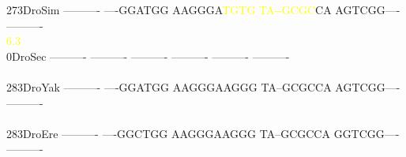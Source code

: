 \documentclass[11pt,twoside,reqno,a4paper]{article}
\begin{document}
{273\hspace*{1\charwidth}DroSim	----------	----GGATGG	AAGGGA\textcolor{Yellow}{T}\textcolor{Yellow}{G}\textcolor{Yellow}{T}\textcolor{Yellow}{G}	\textcolor{Yellow}{T}\textcolor{Yellow}{A}\textcolor{Yellow}{-}\textcolor{Yellow}{-}\textcolor{Yellow}{G}\textcolor{Yellow}{C}\textcolor{Yellow}{G}\textcolor{Yellow}{C}CA	AGTCGG----	----------	\\
\hspace*{4\charwidth}\hspace*{7\charwidth}\hspace*{1\charwidth}\hspace*{1\charwidth}\hspace*{26\charwidth}\textcolor{Yellow}{6.3}\hspace*{1\charwidth}\hspace*{1\charwidth}\hspace*{1\charwidth}\hspace*{1\charwidth}\\
0\hspace*{3\charwidth}DroSec	----------	----------	----------	----------	----------	----------	\\
\hspace*{4\charwidth}\hspace*{7\charwidth}\hspace*{1\charwidth}\hspace*{1\charwidth}\hspace*{1\charwidth}\hspace*{1\charwidth}\hspace*{1\charwidth}\hspace*{1\charwidth}\\
283\hspace*{1\charwidth}DroYak	----------	----GGATGG	AAGGGAAGGG	TA--GCGCCA	AGTCGG----	----------	\\
\hspace*{4\charwidth}\hspace*{7\charwidth}\hspace*{1\charwidth}\hspace*{1\charwidth}\hspace*{1\charwidth}\hspace*{1\charwidth}\hspace*{1\charwidth}\hspace*{1\charwidth}\\
283\hspace*{1\charwidth}DroEre	----------	----GGCTGG	AAGGGAAGGG	TA--GCGCCA	GGTCGG----	----------	\\
}
\end{document}
